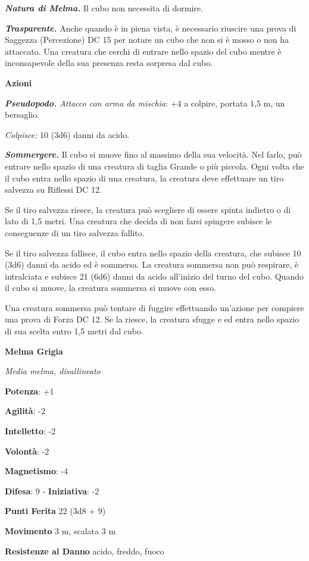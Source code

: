 \begin{multicols}{2}
\emph{\textbf{Natura di Melma.}} Il cubo non necessita di dormire.

\emph{\textbf{Trasparente.}} Anche quando è in piena vista, è necessario
riuscire una prova di Saggezza (Percezione) DC 15 per notare un cubo che
non si è mosso o non ha attaccato. Una creatura che cerchi di entrare
nello spazio del cubo mentre è inconsapevole della sua presenza resta
sorpresa dal cubo.

\textbf{Azioni}

\emph{\textbf{Pseudopodo.} Attacco con arma da mischia}: +4 a colpire,
portata 1,5 m, un bersaglio.

\emph{Colpisce:} 10 (3d6) danni da acido.

\emph{\textbf{Sommergere.}} Il cubo si muove fino al massimo della sua
velocità. Nel farlo, può entrare nello spazio di una creatura di taglia
Grande o più piccola. Ogni volta che il cubo entra nello spazio di una
creatura, la creatura deve effettuare un tiro salvezza su Riflessi DC
12.

Se il tiro salvezza riesce, la creatura può scegliere di essere spinta
indietro o di lato di 1,5 metri. Una creatura che decida di non farsi
spingere subisce le conseguenze di un tiro salvezza fallito.

Se il tiro salvezza fallisce, il cubo entra nello spazio della creatura,
che subisce 10 (3d6) danni da acido ed è sommersa. La creatura sommersa
non può respirare, è intralciata e subisce 21 (6d6) danni da acido
all'inizio del turno del cubo. Quando il cubo si muove, la creatura
sommersa si muove con esso.

Una creatura sommersa può tentare di fuggire effettuando un'azione per
compiere una prova di Forza DC 12. Se la riesce, la creatura sfugge e ed
entra nello spazio di sua scelta entro 1,5 metri dal cubo.

\textbf{Melma Grigia}

\emph{Media melma, disallineato}

\textbf{Potenza}: +1

\textbf{Agilità}: -2

\textbf{Intelletto}: -2

\textbf{Volontà}: -2

\textbf{Magnetismo}: -4

\textbf{Difesa}: 9 - \textbf{Iniziativa}: -2

\textbf{Punti Ferita} 22 (3d8 + 9)

\textbf{Movimento} 3 m, scalata 3 m

\textbf{Resistenze al Danno} acido, freddo, fuoco


\end{multicols}
